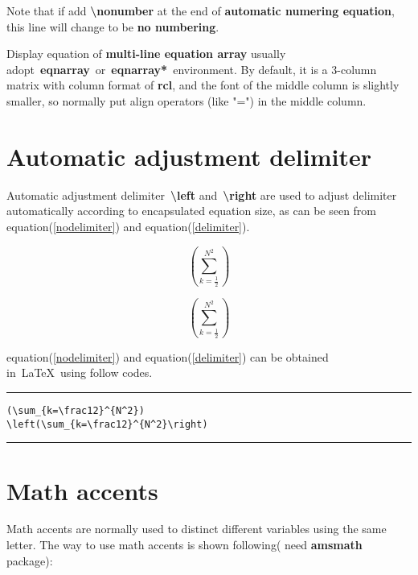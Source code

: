 Note that if add \textbf{\textbackslash nonumber} at the end of \textbf{automatic numering equation}, this line will change to be \textbf{no numbering}.

Display equation of \textbf{multi-line equation array} usually adopt~\textbf{eqnarray}~or~\textbf{eqnarray*}~environment. By default, it is a 3-column matrix with column format of \textbf{rcl}, and the font of the middle column is slightly smaller, so normally put align operators (like "=") in the middle column.

\section{Automatic adjustment delimiter}
Automatic adjustment delimiter~\textbf{\textbackslash left} and~\textbf{\textbackslash right} are used to adjust delimiter automatically according to encapsulated equation size, as can be seen from equation(\ref{nodelimiter}) and equation(\ref{delimiter}).

\begin{equation}\label{nodelimiter}
(\sum_{k=\frac12}^{N^2})
\end{equation}

\begin{equation}\label{delimiter}
\left(\sum_{k=\frac12}^{N^2}\right)
\end{equation}

equation(\ref{nodelimiter}) and equation(\ref{delimiter}) can be obtained in~\LaTeX~using follow codes.

\noindent\vspace{1em}\hrule
\begin{verbatim}
(\sum_{k=\frac12}^{N^2})
\left(\sum_{k=\frac12}^{N^2}\right)
\end{verbatim}
\noindent\hrule\vspace{1em}

\section{Math accents}
Math accents are normally used to distinct different variables using the same letter. The way to use math accents is shown following( need \textbf{amsmath} package):

